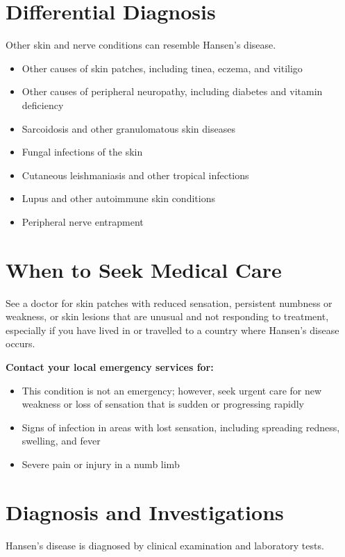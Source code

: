\section*{Differential Diagnosis}
Other skin and nerve conditions can resemble Hansen's disease.

\begin{itemize}
    \item Other causes of skin patches, including tinea, eczema, and vitiligo
    \item Other causes of peripheral neuropathy, including diabetes and vitamin deficiency
    \item Sarcoidosis and other granulomatous skin diseases
    \item Fungal infections of the skin
    \item Cutaneous leishmaniasis and other tropical infections
    \item Lupus and other autoimmune skin conditions
    \item Peripheral nerve entrapment
\end{itemize}

\section*{When to Seek Medical Care}
See a doctor for skin patches with reduced sensation, persistent numbness or weakness, or skin lesions that are unusual and not responding to treatment, especially if you have lived in or travelled to a country where Hansen's disease occurs.

\textbf{Contact your local emergency services for:}
\begin{itemize}
    \item This condition is not an emergency; however, seek urgent care for new weakness or loss of sensation that is sudden or progressing rapidly
    \item Signs of infection in areas with lost sensation, including spreading redness, swelling, and fever
    \item Severe pain or injury in a numb limb
\end{itemize}

\section*{Diagnosis and Investigations}
Hansen's disease is diagnosed by clinical examination and laboratory tests.

